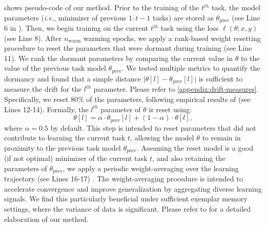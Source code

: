  shows pseudo-code of our method. Prior to the training of the $t^{th}$ task, the model parameters (\textit{i.e.}, minimizer of previous $1:t-1$ tasks) are stored as $\theta_{\textrm{prev}}$ (see Line 6 in ). 
Then, we begin training on the current $t^{th}$ task using the loss $\ell(\theta;x,y)$ (see Line 8). 
After $n_{\textrm{warm}}$ warming epochs, we apply a rank-based weight resetting procedure to reset the parameters that were dormant during training (see Line 11). We rank the dormant parameters by comparing the current value in $\theta$ to the value of the previous task model $\theta_{\textrm{prev}}$. We tested multiple metrics to quantify the dormancy and found that a simple distance $\big|\theta[l] - \theta_{\textrm{prev}}[l]\big|$ is sufficient to measure the drift for the $l^{th}$ parameter. Please refer to \cref{appendix:drift-measures}. Specifically, we reset 80\% of the parameters, following empirical results of \citet{yadav2024ties} (see Lines 12-14). Formally, the $l^{th}$ parameter of $\theta$ is reset using: 
\begin{equation}\label{eq:reset-mix}
    \theta[l] = \alpha\cdot\theta_{\mathrm{prev}}[l] +  (1-\alpha)\cdot\theta[l], 
\end{equation}
%
where $\alpha=0.5$ by default.  This step is intended to reset parameters that did not contribute to learning the current task $t$, allowing the model $\theta$ to remain in proximity to the previous task model $\theta_{\textrm{prev}}$. 
Assuming the reset model is a good (if not optimal) minimizer of the current task $t$, and also retaining the parameters of $\theta_{\textrm{prev}}$, we apply a periodic weight-averaging over the learning trajectory (see Lines 16-17) \citep{izmailov2018averaging}. The weight-averaging procedure is intended to accelerate convergence and improve generalization by aggregating diverse learning signals. We find this particularly beneficial under sufficient exemplar memory settings, where the variance of data is significant. Please refer to  for a detailed elaboration of our method.



